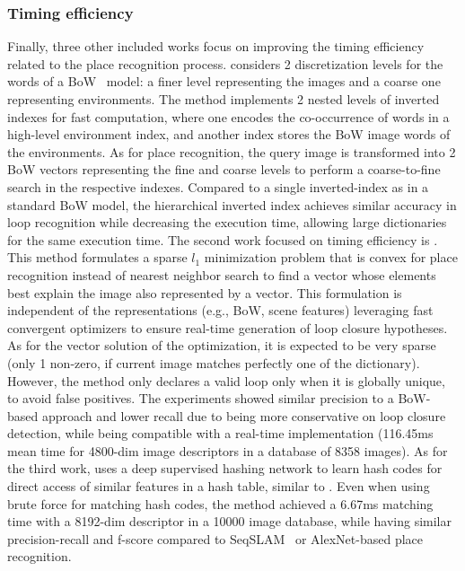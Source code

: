 \subsubsection{Timing efficiency}

Finally, three other included works focus on improving the timing efficiency related to the place recognition process.
\cite{mohan-et-al:2015:7139966} considers 2 discretization levels for the words of a BoW~\parencite{discussion:bow} model: a finer level representing the images and a coarse one representing environments. The method implements 2 nested levels of inverted indexes for fast computation, where one encodes the co-occurrence of words in a high-level environment index, and another index stores the BoW image words of the environments. As for place recognition, the query image is transformed into 2 BoW vectors representing the fine and coarse levels to perform a coarse-to-fine search in the respective indexes. Compared to a single inverted-index as in a standard BoW model, the hierarchical inverted index achieves similar accuracy in loop recognition while decreasing the execution time, allowing large dictionaries for the same execution time.
The second work focused on timing efficiency is \cite{latif-et-al:2017:016}. This method formulates a sparse $l_1$ minimization problem that is convex  for place recognition instead of nearest neighbor search to find a vector whose elements best explain the image also represented by a vector. This formulation is independent of the representations (e.g., BoW, scene features) leveraging fast convergent optimizers to ensure real-time generation of loop closure hypotheses. As for the vector solution of the optimization, it is expected to be very sparse (only 1 non-zero, if current image matches perfectly one of the dictionary). However, the method only declares a valid loop only when it is globally unique, to avoid false positives. The experiments showed similar precision to a BoW-based approach and lower recall due to being more conservative on loop closure detection, while being compatible with a real-time implementation (116.45ms mean time for 4800-dim image descriptors in a database of 8358 images).
As for the third work, \cite{wu-wu:2019:8968599} uses a deep supervised hashing network to learn hash codes for direct access of similar features in a hash table, similar to \cite{ikeda-tanaka:2010:5509579}. Even when using brute force for matching hash codes, the method achieved a 6.67ms matching time with a 8192-dim descriptor in a 10000 image database, while having similar precision-recall and f-score compared to SeqSLAM~\parencite{discussion:seqslam} or AlexNet-based place recognition.





